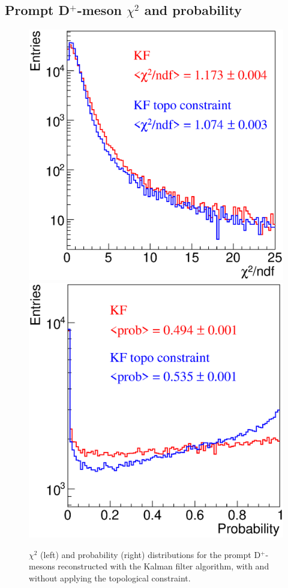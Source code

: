 \documentclass[b5paper,10pt,twoside,oldstyle,classica]{toptesi}
\begin{document}
\subsection{Prompt D$^+$-meson $\chi^2$ and probability}
\begin{figure}[tb]
\begin{center}
{\includegraphics[scale = 0.28]{ChiSquare.eps}}
\hspace{0.cm}
{\includegraphics[scale = 0.28]{Probability.eps}}
\caption{$\chi^2$ (left) and probability (right) distributions for the prompt D$^+$-mesons reconstructed with the Kalman filter algorithm, with and without applying the topological constraint.}
\label{KF_chiprob}
\end{center}
\end{figure} 
\end{document}
